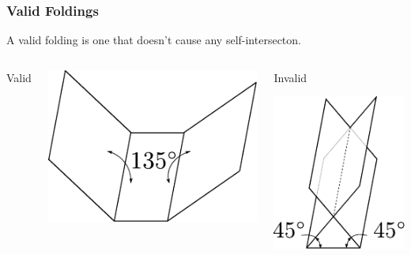 \documentclass{beamer}
\begin{document}
\begin{frame}
\frametitle{Valid Foldings}
\begin{block}{}
A valid folding is one that doesn't cause any self-intersecton. 
\end{block}
\begin{columns}[c]
\begin{center}
Valid
\end{center}
\includegraphics[width=\textwidth]{knot_pix/folded-valid.pdf}
\begin{center}
Invalid

\includegraphics[width=.4\textwidth]{knot_pix/folded-invalid.pdf}
\end{center}
\end{columns}
\end{frame}
\end{document}
